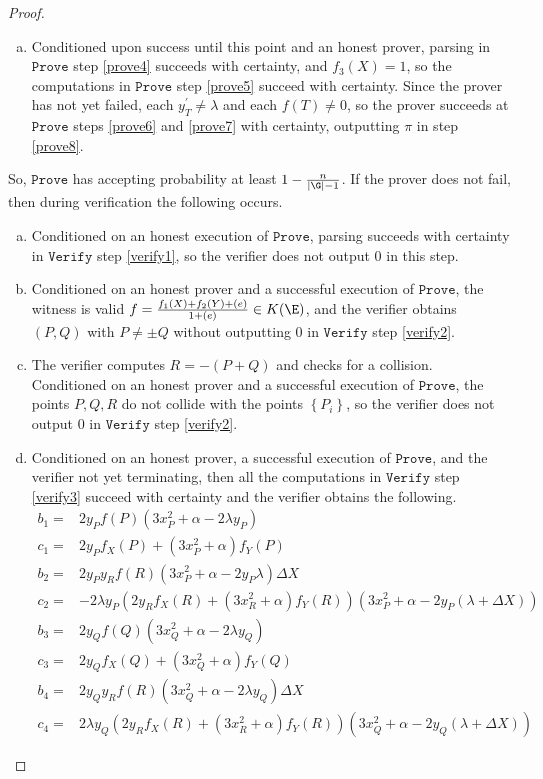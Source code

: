 \documentclass[11pt,letterpaper]{article}
\theoremstyle{definition}
\newcommand{\6}{\mathbf}
\newcommand{\7}{\mathcal}
\begin{document}
\begin{proof}
\begin{enumerate}[(a)]
\item Conditioned upon success until this point and an honest prover, parsing in $\texttt{Prove}$ step \ref{prove4} succeeds with certainty, and $f_3(X) = 1$, so the computations in $\texttt{Prove}$ step \ref{prove5} succeed with certainty. Since the prover has not yet failed, each $y_T^\prime \neq \lambda$ and each $f(T) \neq 0$, so the prover succeeds at $\texttt{Prove}$ steps \ref{prove6} and \ref{prove7} with certainty, outputting $\pi$ in step \ref{prove8}.
\end{enumerate}


So, $\texttt{Prove}$ has accepting probability at least $1 - \frac{n}{\left|\G\right| - 1}$. If the prover does not fail, then during verification the following occurs.
\begin{enumerate}[(a)]
\item Conditioned on an honest execution of $\texttt{Prove}$, parsing succeeds with certainty in $\texttt{Verify}$ step \ref{verify1}, so the verifier does not output $0$ in this step.
\item Conditioned on an honest prover and a successful execution of $\texttt{Prove}$, the witness is valid $f = \frac{f_1(X) + f_2(Y) + (e)}{1+(e)} \in K(\E)$, and the verifier obtains $(P, Q)$ with $P \neq \pm Q$ without outputting $0$ in $\texttt{Verify}$ step \ref{verify2}.
\item The verifier computes $R = -(P+Q)$ and checks for a collision. Conditioned on an honest prover and a successful execution of $\texttt{Prove}$,  the points $P, Q, R$ do not collide with the points $\left\{P_i\right\}$, so the verifier does not output $0$ in $\texttt{Verify}$ step \ref{verify2}.

\item Conditioned on an honest prover, a successful execution of $\texttt{Prove}$, and the verifier not yet terminating, then all the computations in $\texttt{Verify}$ step \ref{verify3} succeed with certainty and the verifier obtains the following.
\begin{align}
b_1 =& 2y_Pf(P)(3x_P^2+\alpha-2\lambda y_P) \\
c_1 =& 2y_Pf_X(P) + (3x_P^2+\alpha) f_Y(P)\\
b_2 =& 2y_Py_Rf(R)(3x_P^2+\alpha-2y_P \lambda ) \Delta X\\
c_2 =& - 2\lambda y_P(2y_Rf_X(R) + (3x_R^2+\alpha) f_Y(R))(3x_P^2+\alpha - 2y_P(\lambda + \Delta X))\\
b_3 =& 2y_Qf(Q)(3x_Q^2+\alpha - 2\lambda y_Q)\\
c_3 =& 2y_Qf_X(Q) + (3x_Q^2+\alpha) f_Y(Q) \\
b_4 =& 2y_Qy_Rf(R)(3x_Q^2+\alpha  - 2\lambda y_Q) \Delta X\\ 
c_4 =& 2\lambda y_Q(2y_Rf_X(R) + (3x_R^2+\alpha)f_Y(R))(3x_Q^2+\alpha - 2y_Q(\lambda + \Delta X))
\end{align} 


\end{enumerate}
\end{proof}
\end{document}
